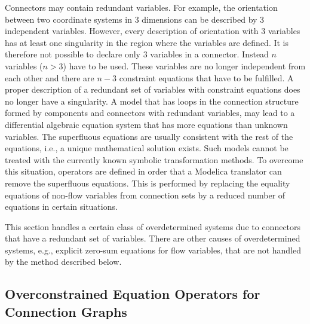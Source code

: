 \begin{nonnormative}
Connectors may contain redundant variables. For example, the
orientation between two coordinate systems in $3$ dimensions can be
described by $3$ independent variables. However, every description of
orientation with $3$ variables has at least one singularity in the region
where the variables are defined. It is therefore not possible to declare
only $3$ variables in a connector. Instead $n$ variables ($n > 3$) have to be used. These variables are no longer independent from each
other and there are $n - 3$ constraint equations that have to be fulfilled.
A proper description of a redundant set of variables with constraint
equations does no longer have a singularity. A model that has loops in
the connection structure formed by components and connectors with
redundant variables, may lead to a differential algebraic equation
system that has more equations than unknown variables. The superfluous
equations are usually consistent with the rest of the equations, i.e., a
unique mathematical solution exists. Such models cannot be treated with
the currently known symbolic transformation methods. To overcome this
situation, operators are defined in order that a Modelica translator can
remove the superfluous equations. This is performed by replacing the
equality equations of non-flow variables from connection sets by a
reduced number of equations in certain situations.

This section handles a certain class of overdetermined systems due
to connectors that have a redundant set of variables. There are other
causes of overdetermined systems, e.g., explicit zero-sum equations for
flow variables, that are not handled by the method described below.
\end{nonnormative}

\subsection{Overconstrained Equation Operators for Connection Graphs}\label{overconstrained-equation-operators-for-connection-graphs}

